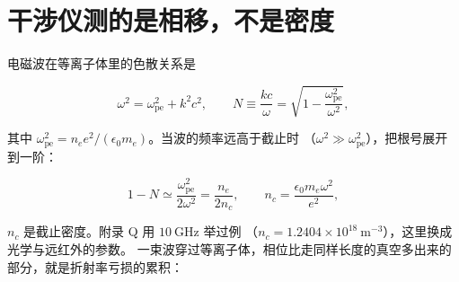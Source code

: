
\section{干涉仪测的是相移，不是密度}
\label{sec:app-aq-phase}

电磁波在等离子体里的色散关系是

\begin{equation}
\omega^2 = \omega_{\mathrm{pe}}^2 + k^2c^2,
\qquad
N \equiv \frac{kc}{\omega} = \sqrt{1-\frac{\omega_{\mathrm{pe}}^2}{\omega^2}},
\label{eq:app-aq-dispersion}
\end{equation}

其中 $\omega_{\mathrm{pe}}^2 = n_ee^2/(\epsilon_0m_e)$。当波的频率远高于截止时
（$\omega^2 \gg \omega_{\mathrm{pe}}^2$），把根号展开到一阶：

\begin{equation}
1 - N \simeq \frac{\omega_{\mathrm{pe}}^2}{2\omega^2} = \frac{n_e}{2n_c},
\qquad
n_c = \frac{\epsilon_0m_e\omega^2}{e^2},
\label{eq:app-aq-refractive}
\end{equation}

$n_c$ 是截止密度。附录 Q 用 $10\ \mathrm{GHz}$ 举过例
（$n_c = 1.2404\times10^{18}\ \mathrm{m^{-3}}$），这里换成光学与远红外的参数。
一束波穿过等离子体，相位比走同样长度的真空多出来的部分，就是折射率亏损的累积：

